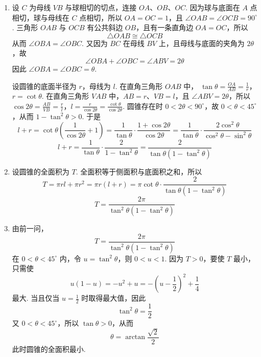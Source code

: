 \documentclass[UTF8,a4paper,oneside,11pt]{ctexbook}
\begin{document}
\begin{solution}
\begin{enumerate}
\item 设 \(C\) 为母线 \(VB\) 与球相切的切点，连接 \(OA\)、\(OB\)、\(OC\). 因为球与底面在 \(A\) 点相切，球与母线在 \(C\) 点相切，所以
\(OA=OC=1\)，且 \(\angle OAB=\angle OCB=90^\circ\).
三角形 \(OAB\) 与 \(OCB\) 有公共斜边 \(OB\)，且有一条直角边 \(OA=OC\)，所以
\[
\triangle OAB\cong\triangle OCB
\]
从而 \(\angle OBA=\angle OBC\). 又因为 \(BC\) 在母线 \(BV\) 上，且母线与底面的夹角为 \(2\theta\)，故
\[
\angle OBA+\angle OBC=\angle ABV=2\theta
\]
因此 \(\angle OBA=\angle OBC=\theta\).

设圆锥的底面半径为 \(r\)，母线为 \(l\). 在直角三角形 \(OAB\) 中，
\(\tan\theta=\frac{OA}{AB}=\frac1r\)，\(r=\cot\theta\).
在直角三角形 \(VAB\) 中，\(AB=r\)、\(VB=l\)，且 \(\angle ABV=2\theta\)，所以
\(\cos2\theta=\frac{AB}{VB}=\frac rl\)，\(l=\frac{r}{\cos2\theta}=\frac{\cot\theta}{\cos2\theta}\).
圆锥存在时 \(0<2\theta<90^\circ\)，故 \(0<\theta<45^\circ\)，从而 \(1-\tan^2\theta>0\). 于是
\[
l+r=\cot\theta\left(\frac{1}{\cos2\theta}+1\right)
=\frac{1}{\tan\theta}\cdot\frac{1+\cos2\theta}{\cos2\theta}
=\frac{1}{\tan\theta}\cdot\frac{2\cos^2\theta}{\cos^2\theta-\sin^2\theta}
\]
\[
l+r=\frac{1}{\tan\theta}\cdot\frac{2}{1-\tan^2\theta}
=\frac{2}{\tan\theta\left(1-\tan^2\theta\right)}
\]

\item 设圆锥的全面积为 \(T\). 全面积等于侧面积与底面积之和，所以
\[
T=\pi rl+\pi r^2
=\pi r\left(l+r\right)
=\pi\cot\theta\cdot\frac{2}{\tan\theta\left(1-\tan^2\theta\right)}
\]
\[
T=\frac{2\pi}{\tan^2\theta\left(1-\tan^2\theta\right)}
\]

\item 由前一问，
\[
T=\frac{2\pi}{\tan^2\theta\left(1-\tan^2\theta\right)}
\]
在 \(0<\theta<45^\circ\) 内，令 \(u=\tan^2\theta\)，则 \(0<u<1\). 因为 \(T>0\)，要使 \(T\) 最小，只需使
\[
u(1-u)=-u^2+u=-\left(u-\frac12\right)^2+\frac14
\]
最大. 当且仅当 \(u=\frac12\) 时取得最大值，因此
\[
\tan^2\theta=\frac12
\]
又 \(0<\theta<45^\circ\)，所以 \(\tan\theta>0\)，从而
\[
\theta=\arctan\frac{\sqrt2}{2}
\]
此时圆锥的全面积最小.
\end{enumerate}
\end{solution}

\end{document}
